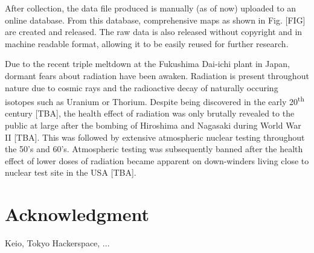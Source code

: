\documentclass[11pt]{article}
\begin{document}
After collection, the data file produced is manually (as of now) uploaded to an online database. From this database, comprehensive maps as shown in Fig. [FIG] 
are created and released. The raw data is also released without copyright and in machine readable format, allowing it to be easily reused for further research.


\label{sec:abstract}

Due to the recent triple meltdown at the Fukushima Dai-ichi plant in Japan, dormant fears about radiation have been awaken.
Radiation is present throughout nature due to cosmic rays and the radioactive decay of naturally occuring isotopes such as Uranium or Thorium.
Despite being discovered in the early 20\textsuperscript{th} century [TBA], the health effect of radiation was only brutally revealed to the public at
large after the bombing of Hiroshima and Nagasaki during World War II [TBA]. This was followed by extensive atmospheric nuclear testing throughout the 50's and 60's.
Atmospheric testing was subsequently banned after the health effect of lower doses of radiation became apparent on down-winders living close to
nuclear test site in the USA [TBA].



\section*{Acknowledgment}
Keio, Tokyo Hackerspace, ...







\end{document}
